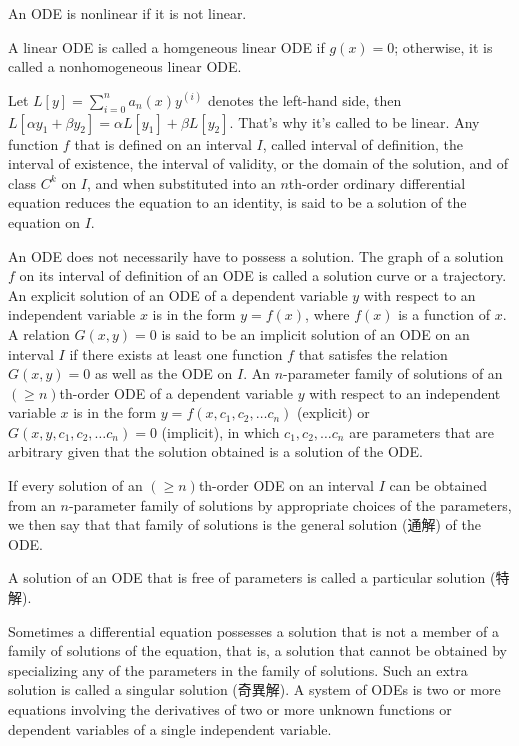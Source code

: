 \documentclass[a4paper,12pt]{report}
\begin{document}
{{{{{{{{{{{{{{{{{An ODE is nonlinear if it is not linear.

A linear ODE is called a homgeneous linear ODE if $g(x)=0$; otherwise, it is called a nonhomogeneous linear ODE.

Let $L[y]=\sum_{i=0}^na_n(x)y^{(i)}$ denotes the left-hand side, then $L[\alpha y_1+\beta y_2]=\alpha L[y_1]+\beta L[y_2]$. That's why it's called to be linear.
Any function $f$ that is defined on an interval $I$, called interval of definition, the interval of existence, the interval of validity, or the domain of the solution, and of class $C^k$ on $I$, and when substituted into an $n$th-order ordinary differential equation reduces the equation to an identity, is said to be a solution of the equation on $I$.

An ODE does not necessarily have to possess a solution.
The graph of a solution $f$ on its interval of definition of an ODE is called a solution curve or a trajectory.
An explicit solution of an ODE of a dependent variable $y$ with respect to an independent variable $x$ is in the form $y=f(x)$, where $f(x)$ is a function of $x$.
A relation $G(x, y) = 0$ is said to be an implicit solution of an ODE on an interval $I$ if there exists at least one function $f$ that satisfes the relation $G(x, y) = 0$ as well as the ODE on $I$.
An $n$-parameter family of solutions of an $(\geq n)$th-order ODE of a dependent variable $y$ with respect to an independent variable $x$ is in the form $y=f(x,c_1,c_2,\dots c_n)$ (explicit) or $G(x,y,c_1,c_2,\dots c_n)=0$ (implicit), in which $c_1,c_2,\dots c_n$ are parameters that are arbitrary given that the solution obtained is a solution of the ODE.

If every solution of an $(\geq n)$th-order ODE on an interval $I$ can be obtained from an $n$-parameter family of solutions by appropriate choices of the parameters, we then say that that family of solutions is the general solution (通解) of the ODE.

A solution of an ODE that is free of parameters is called a particular solution (特解).

Sometimes a differential equation possesses a solution that is not a member of a family of solutions of the equation, that is, a solution that cannot be obtained by specializing any of the parameters in the family of solutions. Such an extra solution is called a singular solution (奇異解).
A system of ODEs is two or more equations involving the derivatives of two or more unknown functions or dependent variables of a single independent variable.

}}}}}}}}}}}}}}}}}
\end{document}
